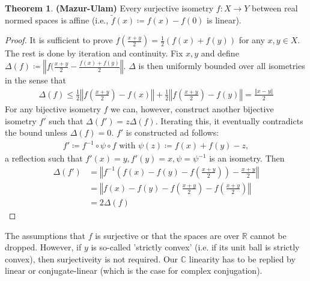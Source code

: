 \documentclass[10pt,a4paper]{article}
\theoremstyle{definition}
\theoremstyle{cor}
\theoremstyle{theorem}
\newtheorem{theorem}{Theorem}
\theoremstyle{lemma}
\theoremstyle{example}
\theoremstyle{remark}
\newcommand{\norm}[1]{\left\Vert #1 \right\Vert}
\begin{document}
\begin{theorem}
\textbf{(Mazur-Ulam)} Every surjective isometry $f: X \to Y$ between real normed spaces is affine (i.e., $\tilde{f}(x)\coloneqq f(x) - f(0)$ is linear).
\end{theorem}
\begin{proof}
It is  sufficient to prove $f(\frac{x+y}{2}) = \frac{1}{2}(f(x) + f(y))$ for any $x,y\in X$. The rest is done by iteration and continuity. Fix $x, y$ and define $\Delta(f)\coloneqq \norm{f(\frac{x+y}{2} - \frac{f(x) + f(y)}{2}}$. $\Delta$ is then uniformly bounded over all isometries in the sense that 
\begin{align*}
\Delta(f) \leq \frac{1}{2}\norm{f(\frac{x+y}{2}) - f(x)} + \frac{1}{2}\norm{f(\frac{x+y}{2}) - f(y)} = \frac{\norm{x-y}}{2}
\end{align*}  
For any bijective isometry $f$ we can, however, construct another bijective isometry $f'$ such that $\Delta(f') = z\Delta(f)$. Iterating this, it eventually contradicts the bound unless $\Delta(f) = 0$. $f'$ is constructed ad follows:
\begin{align*}
f' \coloneqq f^{-1} \circ \psi \circ f \text{ with } \psi(z) \coloneqq f(x) + f(y) - z, 
\end{align*} 
a reflection such that $f'(x) = y, f'(y) = x, \psi = \psi^{-1}$ is an isometry. Then 
\begin{align*}
\Delta(f') &= \norm{f^{-1}\left(f(x) - f(y) - f\left(\frac{x+y}{2}\right)\right) - \frac{x+y}{2}} \\ &= \norm{f(x) - f(y) - f\left(\frac{x+y}{2}\right) - f\left(\frac{x+y}{2}\right)} \\
&= 2\Delta(f)
\end{align*}
\end{proof}
The assumptions that $f$ is surjective or that the spaces are over $\mathbb{R}$ cannot be dropped. However, if $y$ is so-called 'strictly convex' (i.e. if its unit ball is strictly convex), then surjectiveity is not required. Our $\mathbb{C}$ linearity has to be replied by linear or conjugate-linear (which is the case for complex conjugation).
\end{document}
